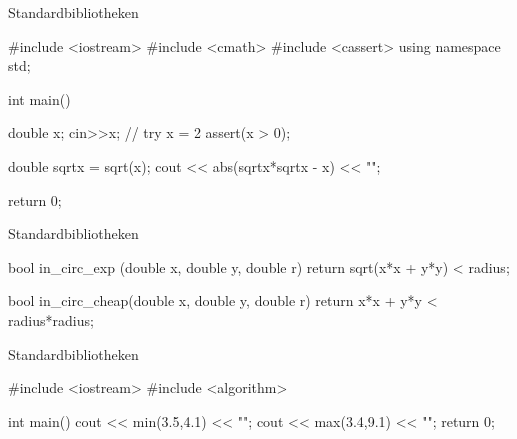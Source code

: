 \ifnum\conditionmacro=1 \documentclass[handout,usenames,dvipsnames]{beamer}\fi
\begin{document}
\begin{frame}[fragile]{Standardbibliotheken}
\begin{TFCpp}
#include <iostream>   
#include <cmath>   
#include <cassert>
using namespace std;

int main(){
	double x;
	cin>>x; // try x = 2
	assert(x > 0);
	
	double sqrtx = sqrt(x);
	cout << abs(sqrtx*sqrtx - x) << "\n";
	
	return 0;
}
\end{TFCpp}

\end{frame}


\begin{frame}[fragile]{Standardbibliotheken}
\begin{TFCpp}
bool in_circ_exp (double x, double y, double r)
{
	return sqrt(x*x + y*y) < radius;
}

bool in_circ_cheap(double x, double y, double r)
{
	return x*x + y*y < radius*radius;
}
\end{TFCpp}
\end{frame}


\begin{frame}[fragile]{Standardbibliotheken}
\begin{TFCpp}
#include <iostream>
#include <algorithm>

int main(){
	cout << min(3.5,4.1) << "\n";
	cout << max(3.4,9.1) << "\n";
	return 0;
}
\end{TFCpp}

\end{frame}
\end{document}
